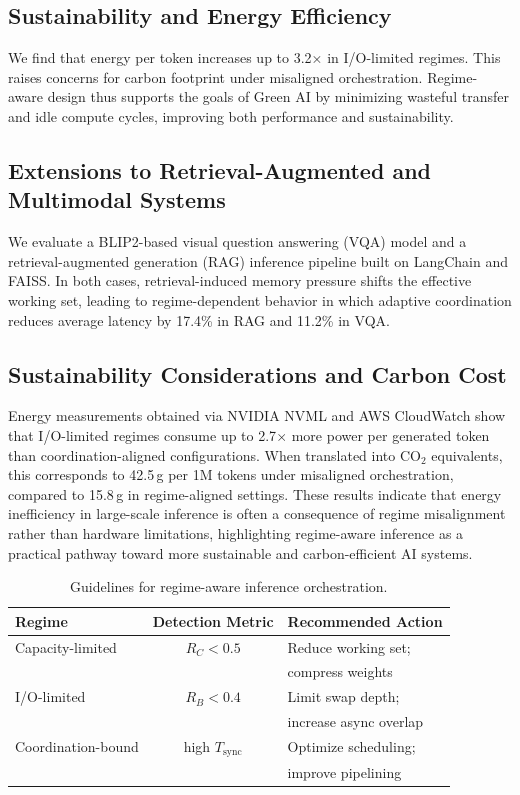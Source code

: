 \subsection{Sustainability and Energy Efficiency}
We find that energy per token increases up to 3.2× in I/O-limited regimes. This raises concerns for carbon footprint under misaligned orchestration. Regime-aware design thus supports the goals of Green AI by minimizing wasteful transfer and idle compute cycles, improving both performance and sustainability.

\subsection{Extensions to Retrieval-Augmented and Multimodal Systems}

We evaluate a BLIP2-based visual question answering (VQA) model and a retrieval-augmented generation (RAG) inference pipeline built on LangChain and FAISS. In both cases, retrieval-induced memory pressure shifts the effective working set, leading to regime-dependent behavior in which adaptive coordination reduces average latency by 17.4\% in RAG and 11.2\% in VQA.


\subsection{Sustainability Considerations and Carbon Cost}

Energy measurements obtained via NVIDIA NVML and AWS CloudWatch show that I/O-limited regimes consume up to 2.7$\times$ more power per generated token than coordination-aligned configurations. When translated into CO$_2$ equivalents, this corresponds to 42.5\,g per 1M tokens under misaligned orchestration, compared to 15.8\,g in regime-aligned settings. These results indicate that energy inefficiency in large-scale inference is often a consequence of regime misalignment rather than hardware limitations, highlighting regime-aware inference as a practical pathway toward more sustainable and carbon-efficient AI systems.


\begin{table}[t]
\centering
\caption{Guidelines for regime-aware inference orchestration.}
\label{tab:regime_guidelines}
\renewcommand{\arraystretch}{1.2}
\footnotesize
\begin{tabular}{|l|c|p{3.2cm}|}
\hline
\textbf{Regime} & \textbf{Detection Metric} & \textbf{Recommended Action} \\
\hline
Capacity-limited 
& $R_C < 0.5$ 
& Reduce working set;\\
& & compress weights \\
\hline
I/O-limited 
& $R_B < 0.4$ 
& Limit swap depth;\\
& & increase async overlap \\
\hline
Coordination-bound 
& high $T_{\text{sync}}$ 
& Optimize scheduling;\\
& & improve pipelining \\
\hline
\end{tabular}
\end{table}


